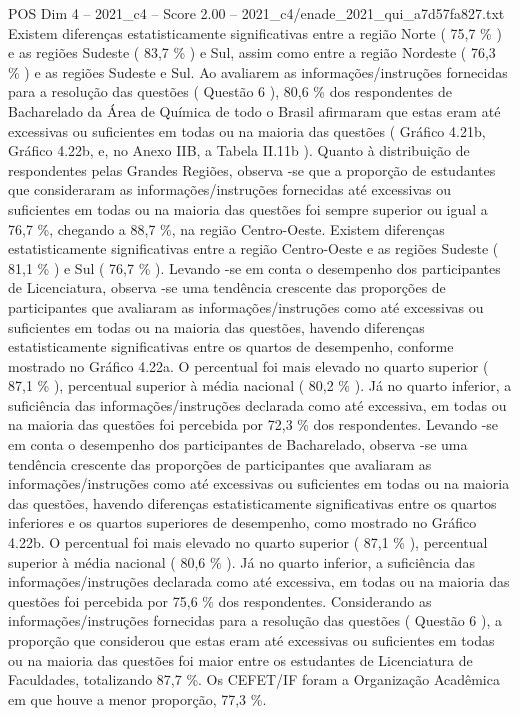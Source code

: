 \begin{textsample}{POS Dim 4 – 2021\_c4 – Score 2.00 – 2021\_c4/enade\_2021\_qui\_a7d57fa827.txt}
Existem diferenças estatisticamente significativas entre a região Norte ( 75,7 \% ) e as regiões Sudeste ( 83,7 \% ) e Sul, assim como entre a região Nordeste ( 76,3 \% ) e as regiões Sudeste e Sul.
Ao avaliarem as informações/instruções fornecidas para a resolução das questões ( Questão 6 ), 80,6 \% dos respondentes de Bacharelado da Área de Química de todo o Brasil afirmaram que estas eram até excessivas ou suficientes em todas ou na maioria das questões ( Gráfico 4.21b, Gráfico 4.22b, e, no Anexo IIB, a Tabela II.11b ).
Quanto à distribuição de respondentes pelas Grandes Regiões, observa -se que a proporção de estudantes que consideraram as informações/instruções fornecidas até excessivas ou suficientes em todas ou na maioria das questões foi sempre superior ou igual a 76,7 \%, chegando a 88,7 \%, na região Centro-Oeste.
Existem diferenças estatisticamente significativas entre a região Centro-Oeste e as regiões Sudeste ( 81,1 \% ) e Sul ( 76,7 \% ).
Levando -se em conta o desempenho dos participantes de Licenciatura, observa -se uma tendência crescente das proporções de participantes que avaliaram as informações/instruções como até excessivas ou suficientes em todas ou na maioria das questões, havendo diferenças estatisticamente significativas entre os quartos de desempenho, conforme mostrado no Gráfico 4.22a.
O percentual foi mais elevado no quarto superior ( 87,1 \% ), percentual superior à média nacional ( 80,2 \% ).
Já no quarto inferior, a suficiência das informações/instruções declarada como até excessiva, em todas ou na maioria das questões foi percebida por 72,3 \% dos respondentes.
Levando -se em conta o desempenho dos participantes de Bacharelado, observa -se uma tendência crescente das proporções de participantes que avaliaram as informações/instruções como até excessivas ou suficientes em todas ou na maioria das questões, havendo diferenças estatisticamente significativas entre os quartos inferiores e os quartos superiores de desempenho, como mostrado no Gráfico 4.22b.
O percentual foi mais elevado no quarto superior ( 87,1 \% ), percentual superior à média nacional ( 80,6 \% ).
Já no quarto inferior, a suficiência das informações/instruções declarada como até excessiva, em todas ou na maioria das questões foi percebida por 75,6 \% dos respondentes.
Considerando as informações/instruções fornecidas para a resolução das questões ( Questão 6 ), a proporção que considerou que estas eram até excessivas ou suficientes em todas ou na maioria das questões foi maior entre os estudantes de Licenciatura de Faculdades, totalizando 87,7 \%.
Os CEFET/IF foram a Organização Acadêmica em que houve a menor proporção, 77,3 \%.

\end{textsample}
